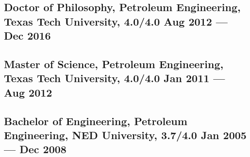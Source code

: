 \documentclass[letter,10pt]{article}
\begin{document}
	\subsection*{Doctor of Philosophy, Petroleum Engineering, {\normalsize \normalfont Texas Tech University, 4.0/4.0} \hfill Aug 2012 --- Dec 2016} 
	\vspace{0.1cm}
	\subsection*{Master of Science, Petroleum Engineering, {\normalsize \normalfont Texas Tech University, 4.0/4.0} \hfill Jan 2011 --- Aug 2012} 
	\vspace{0.1cm}
	\subsection*{Bachelor of Engineering, Petroleum Engineering, {\normalsize \normalfont NED University, 3.7/4.0} \hfill Jan 2005 --- Dec 2008} 
	\vspace{0.2cm}
	

	
\end{document}
